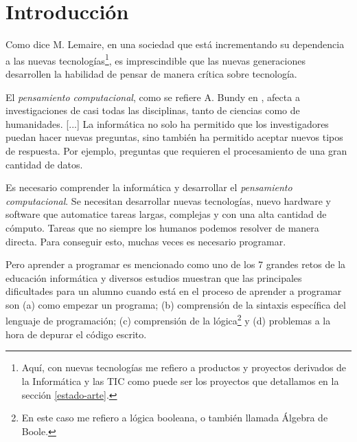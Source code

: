 \chapter{Introducción}\label{introduccion}



Como dice M. Lemaire\cite{lemaire2014incorporating}, en una sociedad que está incrementando su dependencia a las nuevas tecnologías\footnote{Aquí, con nuevas tecnologías me refiero a productos y proyectos derivados de la Informática y las \acrfull{TIC} como puede ser los proyectos que detallamos en la sección \ref{estado-arte}.}, es imprescindible que las nuevas generaciones desarrollen la habilidad de pensar de manera crítica sobre tecnología.

El \emph{pensamiento computacional}, como se refiere A. Bundy en \cite{bundy2007computational}, afecta a  investigaciones de casi todas las disciplinas, tanto de ciencias como de humanidades. [...] La informática no solo ha permitido que los investigadores puedan hacer nuevas preguntas, sino también ha permitido aceptar nuevos tipos de respuesta. Por ejemplo, preguntas que requieren el procesamiento de una gran cantidad de datos.

Es necesario comprender la informática y desarrollar el \emph{pensamiento computacional}. Se necesitan desarrollar nuevas tecnologías, nuevo \gls{hardware} y \gls{software} que automatice tareas largas, complejas y con una alta cantidad de cómputo. Tareas que no siempre los humanos podemos resolver de manera directa. Para conseguir esto, muchas veces es necesario programar.

Pero aprender a programar es mencionado como uno de los 7 grandes retos de la educación informática \cite{mcgettrick2005grand} y diversos estudios \cite{renumol2009classification} muestran que las principales dificultades para un alumno cuando está en el proceso de aprender a programar son (a) como empezar un programa; (b) comprensión de la sintaxis específica del lenguaje de programación; (c) comprensión de la lógica\footnote{En este caso me refiero a lógica booleana, o también llamada Álgebra de Boole.} y (d) problemas a la hora de depurar el código escrito.

